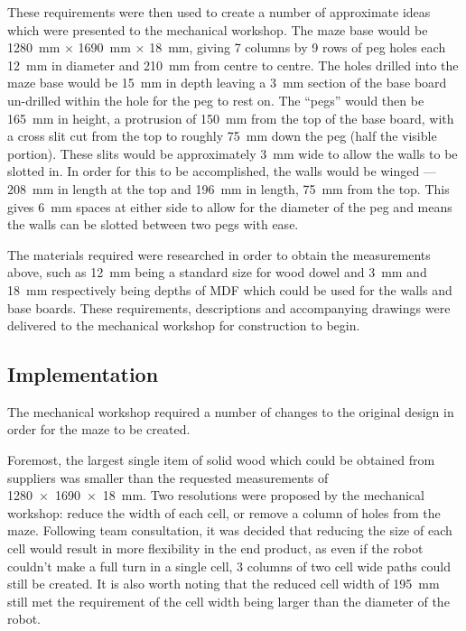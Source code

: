 These requirements were then used to create a number of approximate ideas which
were presented to the mechanical workshop. The maze base would be \SI{1280}{\mm}
$\times$ \SI{1690}{\mm} $\times$ \SI{18}{\mm}, giving 7 columns by 9 rows of
peg holes each \SI{12}{\mm} in diameter and \SI{210}{\mm} from centre to
centre. The holes drilled into the maze base would be \SI{15}{\mm} in depth
leaving a \SI{3}{\mm} section of the base board un-drilled within the hole for the peg to rest on. The ``pegs'' would then be
\SI{165}{\mm} in height, a protrusion of \SI{150}{\mm} from the top of the base board, with a cross slit cut from the top to
roughly \SI{75}{\mm} down the peg
(half the visible portion). These slits would be approximately \SI{3}{\mm} wide to allow the walls to be slotted in. In order for
this to be accomplished, the walls would be winged --- \SI{208}{\mm} in length at the top and \SI{196}{\mm} in length,
\SI{75}{\mm} from the top. This gives \SI{6}{\mm} spaces at either side to allow for the diameter of the peg and means the walls
can be slotted between two pegs with ease.

The materials required were researched in order to obtain the measurements
above, such as \SI{12}{\mm} being a standard size for wood dowel and \SI{3}{\mm}
and \SI{18}{\mm} respectively being depths of MDF which could be used for the
walls and base boards. These requirements, descriptions and accompanying
drawings were delivered to the mechanical workshop for construction to begin.

\subsection{Implementation}\label{test/maze/impl}
The mechanical workshop required a number of changes to the original design in
order for the maze to be created.

Foremost, the largest single item of solid wood which could be obtained from
suppliers was smaller than the requested measurements of \SI{1280 x 1690 x 18}
{\mm}. Two resolutions were proposed by the mechanical workshop: reduce
the width of each cell, or remove a column of holes from the maze. Following
team consultation, it was decided that reducing the size of each cell would
result in more flexibility in the end product, as even if the robot couldn't
make a full turn in a single cell, 3 columns of two cell wide paths could still
be created. It is also worth noting that the reduced cell width of \SI{195}{\mm}
still met the requirement of the cell width being larger than the diameter of
the robot.

